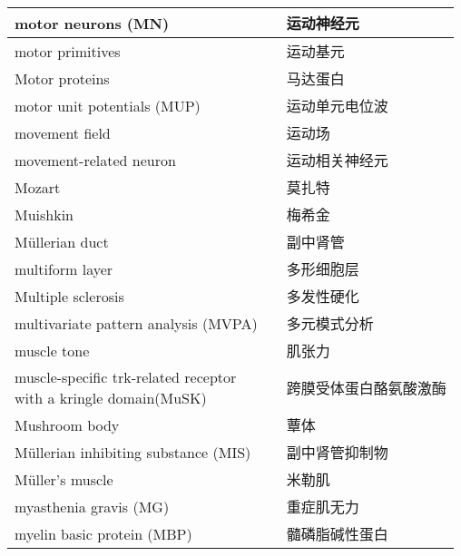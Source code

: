 \begin{longtable}{lll}
	\midrule
	motor neurons (MN)   && 运动神经元  \\
	
	\midrule
	motor primitives   && 运动基元  \\
	
	\midrule
	Motor proteins   && 马达蛋白  \\
	
	\midrule
	motor unit potentials (MUP)  && 运动单元电位波  \\
	
	\midrule
	movement field  && 运动场  \\
	
	\midrule
	movement-related neuron  && 运动相关神经元  \\
	
	\midrule
	Mozart  && 莫扎特  \\
	
	\midrule
	Muishkin   && 梅希金  \\
	
	\midrule
	Müllerian duct   && 副中肾管  \\
	
	\midrule
	multiform layer   && 多形细胞层  \\
	
	\midrule
	Multiple sclerosis   && 多发性硬化  \\
	
	\midrule
	multivariate pattern analysis (MVPA)  && 多元模式分析  \\
	
	\midrule
	muscle tone   && 肌张力  \\
	
	\midrule
	\makecell[l]{muscle-specific trk-related receptor \\with a kringle domain(MuSK)}   && 跨膜受体蛋白酪氨酸激酶  \\
	
	\midrule
	Mushroom body   && 蕈体  \\
	
	\midrule
	Müllerian inhibiting substance (MIS)   && 副中肾管抑制物  \\
	
	\midrule
	Müller's muscle   && 米勒肌  \\
	
	\midrule
	myasthenia gravis (MG)    && 重症肌无力   \\
	
	\midrule
	myelin basic protein (MBP)     && 髓磷脂碱性蛋白   \\
	

\end{longtable}
